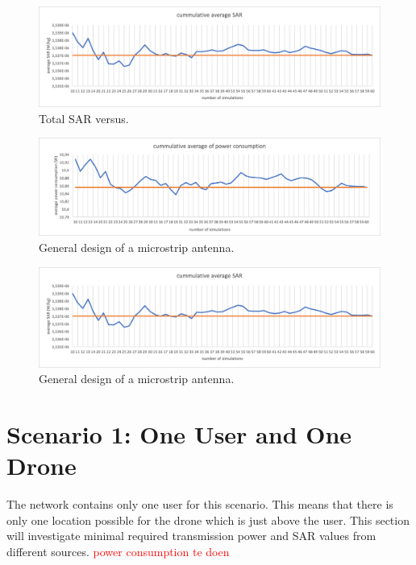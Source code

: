 \begin{figure}[th!]
  \includegraphics[width=\textwidth]{../results/numberOfSim/sarvssim.png}
  \caption{Total SAR versus.}
  \label{fig:fhsar}
\end{figure}
\begin{figure}[th!]
  \includegraphics[width=\textwidth]{../results/numberOfSim/pcvssim.png}
  \caption{General design of a microstrip antenna.}
  \label{fig:fhsar}
\end{figure}
\begin{figure}[th!]
  \includegraphics[width=\textwidth]{../results/numberOfSim/sarvssim.png}
  \caption{General design of a microstrip antenna.}
  \label{fig:fhsar}
\end{figure}
\fi %
\section{Scenario 1: One User and One Drone}
The network contains only one user for this scenario. This means that there is only one location possible for the drone which is just above 
the user. This section will investigate minimal required transmission power and SAR values from different sources.
\textcolor{red}{power consumption te doen}

